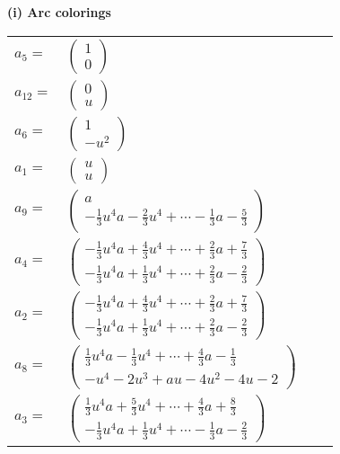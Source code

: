\documentclass[1p]{elsarticle_modified}
\theoremstyle{definition}
\begin{document}
\flushleft \textbf{(i) Arc colorings}\\
\begin{tabular}{m{7pt} m{180pt} m{7pt} m{180pt} }
\flushright $a_{5}=$&$\begin{pmatrix}1\\0\end{pmatrix}$ \\
\flushright $a_{12}=$&$\begin{pmatrix}0\\u\end{pmatrix}$ \\
\flushright $a_{6}=$&$\begin{pmatrix}1\\- u^2\end{pmatrix}$ \\
\flushright $a_{1}=$&$\begin{pmatrix}u\\u\end{pmatrix}$ \\
\flushright $a_{9}=$&$\begin{pmatrix}a\\-\frac{1}{3} u^4 a-\frac{2}{3} u^4+\cdots-\frac{1}{3} a-\frac{5}{3}\end{pmatrix}$ \\
\flushright $a_{4}=$&$\begin{pmatrix}-\frac{1}{3} u^4 a+\frac{4}{3} u^4+\cdots+\frac{2}{3} a+\frac{7}{3}\\-\frac{1}{3} u^4 a+\frac{1}{3} u^4+\cdots+\frac{2}{3} a-\frac{2}{3}\end{pmatrix}$ \\
\flushright $a_{2}=$&$\begin{pmatrix}-\frac{1}{3} u^4 a+\frac{4}{3} u^4+\cdots+\frac{2}{3} a+\frac{7}{3}\\-\frac{1}{3} u^4 a+\frac{1}{3} u^4+\cdots+\frac{2}{3} a-\frac{2}{3}\end{pmatrix}$ \\
\flushright $a_{8}=$&$\begin{pmatrix}\frac{1}{3} u^4 a-\frac{1}{3} u^4+\cdots+\frac{4}{3} a-\frac{1}{3}\\- u^4-2 u^3+a u-4 u^2-4 u-2\end{pmatrix}$ \\
\flushright $a_{3}=$&$\begin{pmatrix}\frac{1}{3} u^4 a+\frac{5}{3} u^4+\cdots+\frac{4}{3} a+\frac{8}{3}\\-\frac{1}{3} u^4 a+\frac{1}{3} u^4+\cdots-\frac{1}{3} a-\frac{2}{3}\end{pmatrix}$ \\

\end{tabular}
\end{document}
